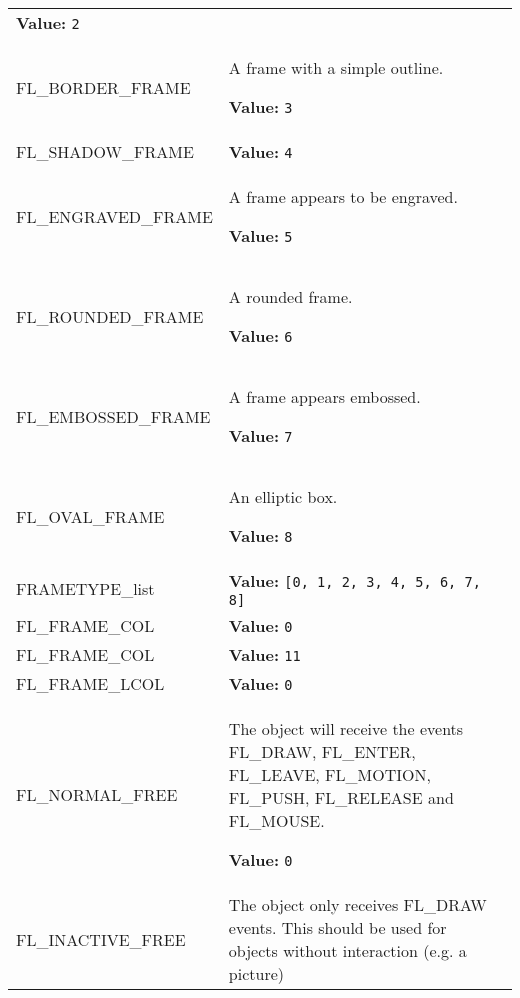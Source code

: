\begin{longtable}{|p{\varnamewidth}|p{\vardescrwidth}|l}
\textbf{Value:} 
{\tt 2}&\\
\cline{1-2}
\raggedright F\-L\-\_\-B\-O\-R\-D\-E\-R\-\_\-F\-R\-A\-M\-E\- & \raggedright A frame with a simple outline.

\textbf{Value:} 
{\tt 3}&\\
\cline{1-2}
\raggedright F\-L\-\_\-S\-H\-A\-D\-O\-W\-\_\-F\-R\-A\-M\-E\- & \raggedright \textbf{Value:} 
{\tt 4}&\\
\cline{1-2}
\raggedright F\-L\-\_\-E\-N\-G\-R\-A\-V\-E\-D\-\_\-F\-R\-A\-M\-E\- & \raggedright A frame appears to be engraved.

\textbf{Value:} 
{\tt 5}&\\
\cline{1-2}
\raggedright F\-L\-\_\-R\-O\-U\-N\-D\-E\-D\-\_\-F\-R\-A\-M\-E\- & \raggedright A rounded frame.

\textbf{Value:} 
{\tt 6}&\\
\cline{1-2}
\raggedright F\-L\-\_\-E\-M\-B\-O\-S\-S\-E\-D\-\_\-F\-R\-A\-M\-E\- & \raggedright A frame appears embossed.

\textbf{Value:} 
{\tt 7}&\\
\cline{1-2}
\raggedright F\-L\-\_\-O\-V\-A\-L\-\_\-F\-R\-A\-M\-E\- & \raggedright An elliptic box.

\textbf{Value:} 
{\tt 8}&\\
\cline{1-2}
\raggedright F\-R\-A\-M\-E\-T\-Y\-P\-E\-\_\-l\-i\-s\-t\- & \raggedright \textbf{Value:} 
{\tt \texttt{[}0\texttt{, }1\texttt{, }2\texttt{, }3\texttt{, }4\texttt{, }5\texttt{, }6\texttt{, }7\texttt{, }8\texttt{]}}&\\
\cline{1-2}
\raggedright F\-L\-\_\-F\-R\-A\-M\-E\-\_\-C\-O\-L\-1\- & \raggedright \textbf{Value:} 
{\tt 0}&\\
\cline{1-2}
\raggedright F\-L\-\_\-F\-R\-A\-M\-E\-\_\-C\-O\-L\-2\- & \raggedright \textbf{Value:} 
{\tt 11}&\\
\cline{1-2}
\raggedright F\-L\-\_\-F\-R\-A\-M\-E\-\_\-L\-C\-O\-L\- & \raggedright \textbf{Value:} 
{\tt 0}&\\
\cline{1-2}
\raggedright F\-L\-\_\-N\-O\-R\-M\-A\-L\-\_\-F\-R\-E\-E\- & \raggedright The object will receive the events FL\_DRAW, FL\_ENTER, FL\_LEAVE,
FL\_MOTION, FL\_PUSH, FL\_RELEASE and FL\_MOUSE.

\textbf{Value:} 
{\tt 0}&\\
\cline{1-2}
\raggedright F\-L\-\_\-I\-N\-A\-C\-T\-I\-V\-E\-\_\-F\-R\-E\-E\- & \raggedright The object only receives FL\_DRAW events. This should be used for
objects without interaction (e.g. a picture)


\end{longtable}
